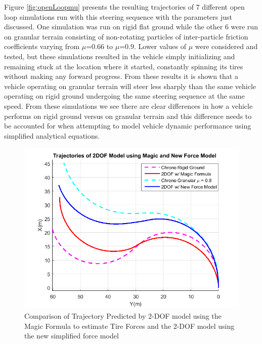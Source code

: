 \documentclass[12pt,onecolumn]{report}
\begin{document}
Figure \ref{fig:openLoopmu} presents the resulting trajectories of 7 different open loop simulations run with this steering sequence with the parameters just discussed. One simulation was run on rigid flat ground while the other 6 were run on granular terrain consisting of non-rotating particles of inter-particle friction coefficients varying from $\mu$=0.66 to $\mu$=0.9. Lower values of $\mu$ were considered and tested, but these simulations resulted in the vehicle simply initializing and remaining stuck at the location where it started, constantly spinning its tires without making any forward progress. From these results it is shown that a vehicle operating on granular terrain will steer less sharply than the same vehicle operating on rigid ground undergoing the same steering sequence at the same speed. From these simulations we see there are clear differences in how a vehicle performs on rigid ground versus on granular terrain and this difference needs to be accounted for when attempting to model vehicle dynamic performance using simplified analytical equations. 

\begin{figure}
	\centering
	\includegraphics[width=0.8\columnwidth]{Figs/MagicvsNew.png}
	\caption{\small Comparison of Trajectory Predicted by 2-DOF model using the Magic Formula to estimate Tire Forces and the 2-DOF model using the new simplified force model}  
	\label{fig:MagicvsNew}
\end{figure}
\end{document}
